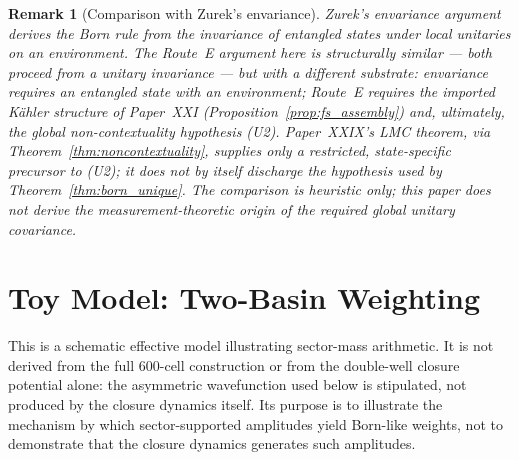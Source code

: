 \documentclass[12pt]{article}
\newtheorem{remark}[theorem]{Remark}
\begin{document}
\begin{remark}[Comparison with Zurek's envariance]\label{rem:zurek}
Zurek's envariance argument~\citep{Zurek2005} derives the Born rule from the invariance of entangled states under local unitaries on an environment. The Route~E argument here is structurally similar --- both proceed from a unitary invariance --- but with a different substrate: envariance requires an entangled state with an environment; Route~E requires the imported K\"ahler structure of Paper~XXI (Proposition~\ref{prop:fs_assembly}) and, ultimately, the global non-contextuality hypothesis (U2). Paper~XXIX's LMC theorem, via Theorem~\ref{thm:noncontextuality}, supplies only a restricted, state-specific precursor to (U2); it does not by itself discharge the hypothesis used by Theorem~\ref{thm:born_unique}. The comparison is heuristic only; this paper does not derive the measurement-theoretic origin of the required global unitary covariance.
\end{remark}

\section{Toy Model: Two-Basin Weighting}\label{sec:toy}

This is a schematic effective model illustrating sector-mass arithmetic. It is not derived from the full 600-cell construction or from the double-well closure potential alone: the asymmetric wavefunction used below is stipulated, not produced by the closure dynamics itself. Its purpose is to illustrate the mechanism by which sector-supported amplitudes yield Born-like weights, not to demonstrate that the closure dynamics generates such amplitudes.
\end{document}
